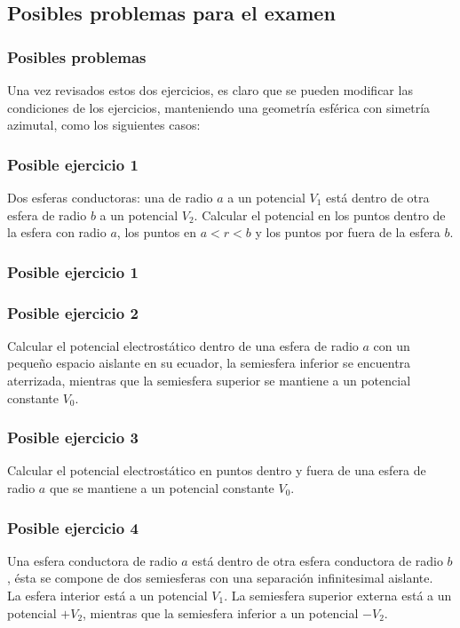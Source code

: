 \subsection{Posibles problemas para el examen}
\begin{frame}
\frametitle{Posibles problemas}
Una vez revisados estos dos ejercicios, es claro que se pueden modificar las condiciones de los ejercicios, manteniendo una geometría esférica con simetría azimutal, como los siguientes casos:
\end{frame}
\begin{frame}
\frametitle{Posible ejercicio 1}
Dos esferas conductoras: una de radio $a$ a un potencial $V_{1}$ está dentro de otra esfera de radio $b$ a un potencial $V_{2}$. Calcular el potencial en los puntos dentro de la esfera con radio $a$, los puntos en $ a < r < b$ y los puntos por fuera de la esfera $b$.
\end{frame}
\begin{frame}
\frametitle{Posible ejercicio 1}
\begin{figure}
    \centering
    
\end{figure}
\end{frame}
\begin{frame}
\frametitle{Posible ejercicio 2}
\fontsize{12}{12}\selectfont
Calcular el potencial electrostático dentro de una esfera de radio $a$ con un pequeño espacio aislante en su ecuador, la semiesfera inferior se encuentra aterrizada, mientras que la semiesfera superior se mantiene a un potencial constante $V_{0}$.
\begin{figure}
    \centering
    
\end{figure}
\end{frame}
\begin{frame}
\frametitle{Posible ejercicio 3}
\fontsize{12}{12}\selectfont
Calcular el potencial electrostático en puntos dentro y fuera de una esfera de radio $a$ que se mantiene a un potencial constante $V_{0}$.
\begin{figure}
    \centering
    
\end{figure}
\end{frame}
\begin{frame}
\frametitle{Posible ejercicio 4}
Una esfera conductora de radio $a$ está dentro de otra esfera conductora de radio $b$, ésta se compone de dos semiesferas con una separación infinitesimal aislante.
\\
\bigskip
La esfera interior está a un potencial $V_{1}$. La semiesfera superior externa está a un potencial $+V_{2}$, mientras que la semiesfera inferior a un potencial $-V_{2}$.
\end{frame}

